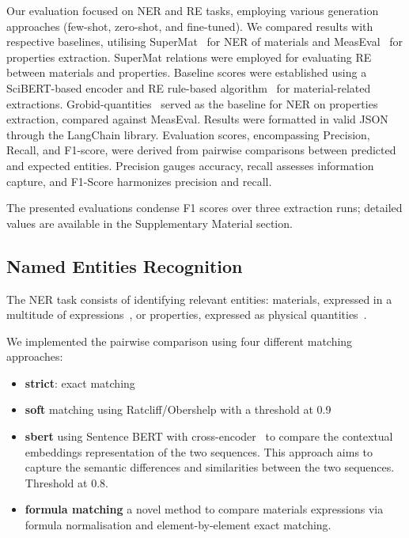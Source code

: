 \documentclass[a4paper]{article}
\begin{document}
Our evaluation focused on NER and RE tasks, employing various generation approaches (few-shot, zero-shot, and fine-tuned). 
We compared results with respective baselines, utilising SuperMat~\cite{lfoppiano2021supermat} for NER of materials and MeasEval~\cite{harper2021semeval2021} for properties extraction. SuperMat relations were employed for evaluating RE between materials and properties.
Baseline scores were established using a SciBERT-based encoder and RE rule-based algorithm~\cite{lfoppiano2023automatic} for material-related extractions. Grobid-quantities~\cite{foppiano2019quantities} served as the baseline for NER on properties extraction, compared against MeasEval.
Results were formatted in valid JSON through the LangChain library. Evaluation scores, encompassing Precision, Recall, and F1-score, were derived from pairwise comparisons between predicted and expected entities. Precision gauges accuracy, recall assesses information capture, and F1-Score harmonizes precision and recall.

The presented evaluations condense F1 scores over three extraction runs; detailed values are available in the Supplementary Material section.

\subsection{Named Entities Recognition}
\label{sec:ner}
The NER task consists of identifying relevant entities: materials, expressed in a multitude of expressions~\cite{lfoppiano2021supermat}, or properties, expressed as physical quantities~\cite{foppiano2019quantities}. 

We implemented the pairwise comparison using four different matching approaches: 
\begin{itemize}
    \item \textbf{strict}: exact matching
    \item \textbf{soft} matching using Ratcliff/Obershelp with a threshold at 0.9
    \item \textbf{sbert} using Sentence BERT with cross-encoder~\cite{reimers2019sentencebert} to compare the contextual embeddings representation of the two sequences. This approach aims to capture the semantic differences and similarities between the two sequences. Threshold at 0.8.
    \item \textbf{formula matching} a novel method to compare materials expressions via formula normalisation and element-by-element exact matching.
\end{itemize}
\end{document}
